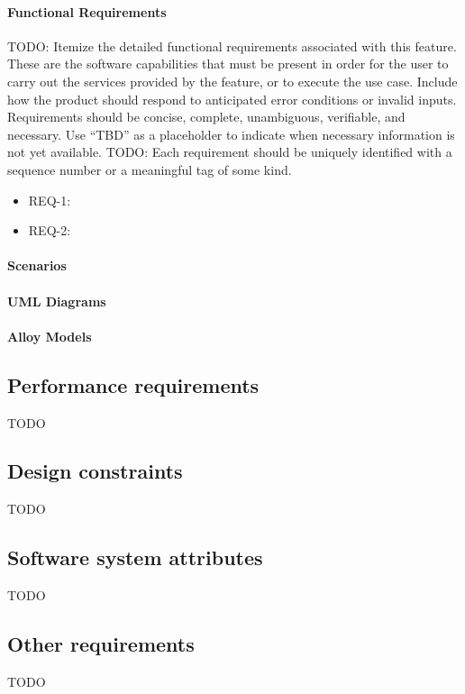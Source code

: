 \paragraph{Functional Requirements}
TODO: Itemize the detailed functional requirements associated with this feature. These are the software capabilities that must be present in order for the user to carry out the services provided by the feature, or to execute the use case. Include how the product should respond to anticipated error conditions or invalid inputs. Requirements should be concise, complete, unambiguous, verifiable, and necessary. Use “TBD” as a placeholder to indicate when necessary information is not yet available.
TODO: Each requirement should be uniquely identified with a sequence number or a meaningful tag of some kind.
\begin{itemize}
	\item REQ-1:  
	\item REQ-2:
\end{itemize}
\paragraph{Scenarios}
\paragraph{UML Diagrams}
\paragraph{Alloy Models}
\subsection{Performance requirements}
TODO
\subsection{Design constraints}
TODO
\subsection{Software system attributes}
TODO
\subsection{Other requirements}
TODO